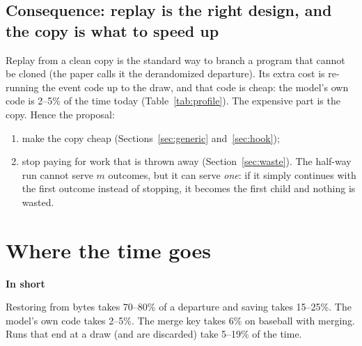 \documentclass[11pt]{article}
\newcommand{\shadedbox}[3]{\par\smallskip\noindent\colorbox{#1}{\parbox{\dimexpr\linewidth-2\fboxsep}{\textbf{#2}\par #3}}\par\smallskip}
\newcommand{\takeaway}[1]{\shadedbox{okbg}{In short}{#1}}
\begin{document}
\subsection{Consequence: replay is the right design, and the copy is what to speed up}
Replay from a clean copy is the standard way to branch a program that cannot be cloned (the paper calls it the
derandomized departure). Its extra cost is re-running the event code up to the draw, and that code is cheap: the
model's own code is 2--5\% of the time today (Table~\ref{tab:profile}). The expensive part is the copy. Hence the
proposal:
\begin{enumerate}
\item make the copy cheap (Sections~\ref{sec:generic} and~\ref{sec:hook});
\item stop paying for work that is thrown away (Section~\ref{sec:waste}). The half-way run cannot serve $m$ outcomes,
  but it can serve \emph{one}: if it simply continues with the first outcome instead of stopping, it becomes the first
  child and nothing is wasted.
\end{enumerate}

\section{Where the time goes}\label{sec:profile}

\takeaway{Restoring from bytes takes 70--80\% of a departure and saving takes 15--25\%. The model's own code takes
2--5\%. The merge key takes 6\% on baseball with merging. Runs that end at a draw (and are discarded) take 5--19\% of
the time.}
\end{document}
